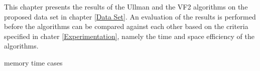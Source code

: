 \label{Experiment Results}
This chapter presents the results of the Ullman and the VF2 algorithms on the proposed data set in chapter \ref{Data Set}. An evaluation of the results is
performed before the algorithms can be compared against each other based on the criteria specified in chater \ref{Experimentation}, namely the time and 
space efficiency of the algorithms.

{memory}
{time}
{cases}

\newpage